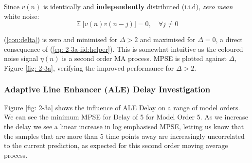 \documentclass[12pt]{article}
\numberwithin{equation}{section}
\DeclareMathOperator*{\E}{\mathbb{E}}
\begin{document}
		\noindent
		Since $v(n)$ is identically and \textbf{independently} distributed (i.i.d), \textit{zero mean} white noise:
		\begin{equation}
		\E \bigg[ v(n) v(n - j) \bigg] = 0, \quad \forall j \neq 0
		\label{eq: 2-3a-iid:helper}
		\end{equation}
		
		(\ref{con:delta}) is zero and minimised for $\Delta > 2$ and maximised for $\Delta = 0$, a direct consequence of (\ref{eq: 2-3a-iid:helper}).
		This is somewhat intuitive as the coloured noise signal $\eta(n)$ is a second order MA process. \newline
		\noindent
		MPSE is plotted against $\Delta$, Figure \ref{fig: 2-3a}, verifying the improved performance for $\Delta > 2$.
		
		\subsubsection{Adaptive Line Enhancer (ALE) Delay Investigation}
		\begin{minipage}[b]{0.49\textwidth}
				Figure \ref{fig: 2-3a} shows the influence of ALE Delay on a range of model orders. We can see the minimum MPSE for Delay of 5 for Model Order 5. As we increase the delay we see a linear increase in log emphasised MPSE, letting us know that the samples that are more than 5 time points away are increasingly uncorrelated to the current prediction, as expected for this second order moving average process.
		\end{minipage}%
		\begin{minipage}{0.04\textwidth}
			\hspace*{0.04\textwidth}
		\end{minipage}%
\end{document}
